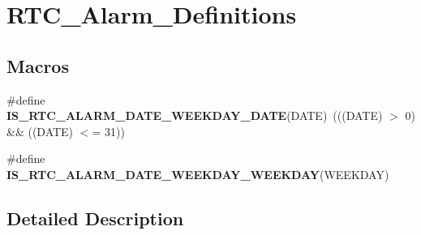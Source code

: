 \hypertarget{group___r_t_c___alarm___definitions}{\section{R\-T\-C\-\_\-\-Alarm\-\_\-\-Definitions}
\label{group___r_t_c___alarm___definitions}
}
\subsection*{Macros}
\begin{DoxyCompactItemize}
\item 
\hypertarget{group___r_t_c___alarm___definitions_ga8b6cb39fac113de7c5d2b05a93093243}{\#define {\bfseries I\-S\-\_\-\-R\-T\-C\-\_\-\-A\-L\-A\-R\-M\-\_\-\-D\-A\-T\-E\-\_\-\-W\-E\-E\-K\-D\-A\-Y\-\_\-\-D\-A\-T\-E}(D\-A\-T\-E)~(((D\-A\-T\-E) $>$ 0) \&\& ((D\-A\-T\-E) $<$= 31))}\label{group___r_t_c___alarm___definitions_ga8b6cb39fac113de7c5d2b05a93093243}

\item 
\#define {\bfseries I\-S\-\_\-\-R\-T\-C\-\_\-\-A\-L\-A\-R\-M\-\_\-\-D\-A\-T\-E\-\_\-\-W\-E\-E\-K\-D\-A\-Y\-\_\-\-W\-E\-E\-K\-D\-A\-Y}(W\-E\-E\-K\-D\-A\-Y)
\end{DoxyCompactItemize}


\subsection{Detailed Description}


